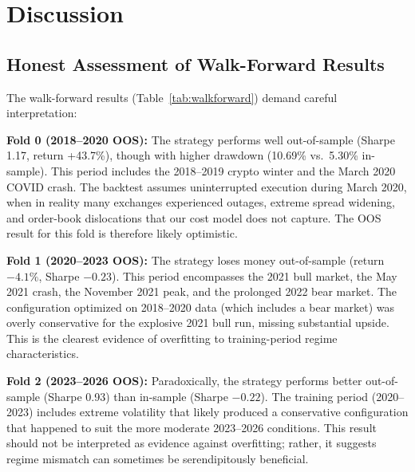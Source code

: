\documentclass{article}
\begin{document}
\section{Discussion}
\label{sec:discussion}

\subsection{Honest Assessment of Walk-Forward Results}

The walk-forward results (Table~\ref{tab:walkforward}) demand careful interpretation:

\textbf{Fold 0 (2018--2020 OOS):} The strategy performs well out-of-sample (Sharpe 1.17, return +43.7\%), though with higher drawdown (10.69\% vs.\ 5.30\% in-sample).
This period includes the 2018--2019 crypto winter and the March 2020 COVID crash.
The backtest assumes uninterrupted execution during March 2020, when in reality many exchanges experienced outages, extreme spread widening, and order-book dislocations that our cost model does not capture.
The OOS result for this fold is therefore likely optimistic.

\textbf{Fold 1 (2020--2023 OOS):} The strategy loses money out-of-sample (return $-4.1\%$, Sharpe $-0.23$).
This period encompasses the 2021 bull market, the May 2021 crash, the November 2021 peak, and the prolonged 2022 bear market.
The configuration optimized on 2018--2020 data (which includes a bear market) was overly conservative for the explosive 2021 bull run, missing substantial upside.
This is the clearest evidence of overfitting to training-period regime characteristics.

\textbf{Fold 2 (2023--2026 OOS):} Paradoxically, the strategy performs better out-of-sample (Sharpe 0.93) than in-sample (Sharpe $-0.22$).
The training period (2020--2023) includes extreme volatility that likely produced a conservative configuration that happened to suit the more moderate 2023--2026 conditions.
This result should not be interpreted as evidence against overfitting; rather, it suggests regime mismatch can sometimes be serendipitously beneficial.
\end{document}
